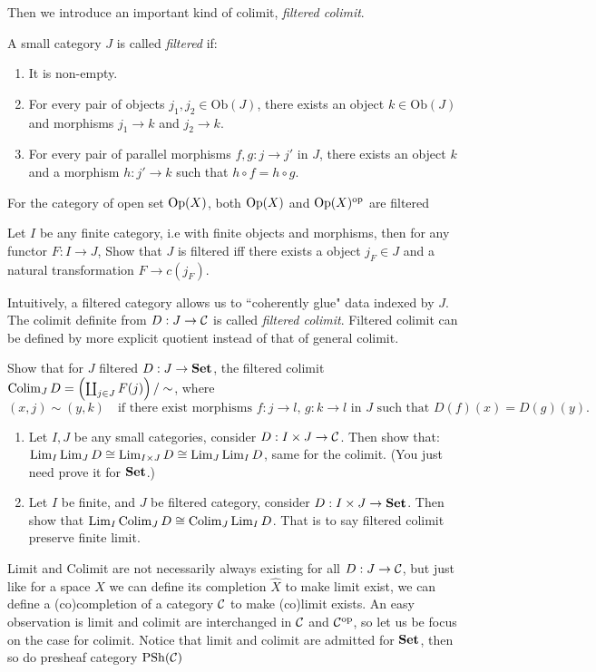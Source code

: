 Then we introduce an important kind of colimit, \emph{filtered colimit}. 
\begin{definition}
  A small category $J$ is called \emph{filtered} if:
  \begin{enumerate}
        \item It is non-empty.
              \item For every pair of objects $j_1, j_2 \in \mathrm{Ob}(J)$, there exists an object $k \in \mathrm{Ob}(J)$ and morphisms $j_1 \to k$ and $j_2 \to k$.
                    \item For every pair of parallel morphisms $f, g : j \to j'$ in $J$, there exists an object $k$ and a morphism $h : j' \to k$ such that $h \circ f = h \circ g$.
  \end{enumerate}
\end{definition} 
\begin{example}
 For the category of open set $\mathrm{Op}(X)$, both $\mathrm{Op}(X)$ and $\mathrm{Op}(X)^{\mathrm{op}}$ are filtered
\end{example}
\begin{exercise}
 Let $I$ be any finite category, i.e with finite objects and morphisms, then for any functor $F:I\to J$, Show that $J$ is filtered iff there exists a object $j_F \in J$ and a natural transformation $F\to c(j_F)$.
\end{exercise}
Intuitively, a filtered category allows us to ``coherently glue" data indexed by $J$. The colimit definite from $D: J\to \mathcal{C}$ is called \emph{filtered colimit}. Filtered colimit can be defined by more explicit quotient instead of that of general colimit.
\begin{exercise}
  Show that for $J$ filtered $D:J\to\mathbf{Set}$, the filtered colimit $\operatorname*{\mathrm{Colim}}_J D = \left( \coprod_{j \in J} F(j)\right) / \sim$, where 
\[
    (x, j) \sim (y, k) \quad \text{if there exist morphisms } f : j \to l,\, g : k \to l \text{ in } J \text{ such that } D(f)(x) = D(g)(y).
    \]
\end{exercise}
  \begin{exercise}
   \begin{enumerate}
     \item Let $I,J$ be any small categories, consider $D: I \times J \to \mathcal{C}$. Then show that: $\operatorname*{\mathrm{Lim}}_I\operatorname*{\mathrm{Lim}}_J D \cong \operatorname*{\mathrm{Lim}}_{I\times J} D \cong \operatorname*{\mathrm{Lim}}_J\operatorname*{\mathrm{Lim}}_I D$, same for the colimit. (You just need prove it for $\mathbf{Set}$.)
     \item Let $I$ be finite, and $J$ be filtered category, consider $D:I\times J \to \mathbf{Set}$. Then show that $\operatorname*{\mathrm{Lim}}_I\operatorname*{\mathrm{Colim}}_J D \cong \operatorname*{\mathrm{Colim}}_J\operatorname*{\mathrm{Lim}}_I D$. That is to say filtered colimit preserve finite limit.
   \end{enumerate} 
  \end{exercise}
Limit and Colimit are not necessarily always existing for all $D:J\to\mathcal{C}$, but just like for a space $X$ we can define its completion $\hat{X}$ to make limit exist, we can define a (co)completion of a category $\mathcal{C}$ to make (co)limit exists. An easy observation is limit and colimit are interchanged in $\mathcal{C}$ and $\mathcal{C}^{\mathrm{op}}$, so let us be focus on the case for colimit. Notice that limit and colimit are admitted for $\mathbf{Set}$, then so do presheaf category $\mathrm{PSh}(\mathcal{C})$

